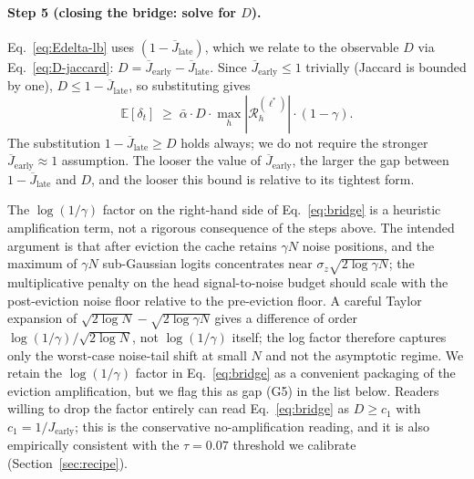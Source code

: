 \documentclass{article} %
\begin{document}
\paragraph{Step 5 (closing the bridge: solve for $D$).}
Eq.~\eqref{eq:Edelta-lb} uses $(1 - \overline{J}_{\text{late}})$, which we
relate to the observable $D$ via Eq.~\eqref{eq:D-jaccard}: $D =
\overline{J}_{\text{early}} - \overline{J}_{\text{late}}$. Since
$\overline{J}_{\text{early}} \leq 1$ trivially (Jaccard is bounded by
one), $D \leq 1 - \overline{J}_{\text{late}}$, so substituting gives
\begin{equation}
\label{eq:final-lb}
\mathbb{E}[\delta_t]
\;\geq\;
\bar\alpha \cdot D \cdot \max_h |\mathcal{R}^{(\ell^*)}_h|
\cdot (1 - \gamma).
\end{equation}
The substitution $1 - \overline{J}_{\text{late}} \geq D$ holds always; we
do not require the stronger $\overline{J}_{\text{early}} \approx 1$
assumption. The looser the value of $\overline{J}_{\text{early}}$, the
larger the gap between $1 - \overline{J}_{\text{late}}$ and $D$, and the
looser this bound is relative to its tightest form.

The $\log(1/\gamma)$ factor on the right-hand side of
Eq.~\eqref{eq:bridge} is a heuristic amplification term, not a rigorous
consequence of the steps above. The intended argument is that after
eviction the cache retains $\gamma N$ noise positions, and the maximum of
$\gamma N$ sub-Gaussian logits concentrates near $\sigma_z \sqrt{2 \log
\gamma N}$; the multiplicative penalty on the head signal-to-noise budget
should scale with the post-eviction noise floor relative to the
pre-eviction floor. A careful Taylor expansion of $\sqrt{2 \log N} -
\sqrt{2 \log \gamma N}$ gives a difference of order $\log(1/\gamma) /
\sqrt{2 \log N}$, not $\log(1/\gamma)$ itself; the log factor therefore
captures only the worst-case noise-tail shift at small $N$ and not the
asymptotic regime. We retain the $\log(1/\gamma)$ factor in
Eq.~\eqref{eq:bridge} as a convenient packaging of the eviction
amplification, but we flag this as gap (G5) in the list below. Readers
willing to drop the factor entirely can read Eq.~\eqref{eq:bridge} as $D
\geq c_1$ with $c_1 = 1/J_{\text{early}}$; this is the conservative
no-amplification reading, and it is also empirically consistent with the
$\tau = 0.07$ threshold we calibrate (Section~\ref{sec:recipe}).
\end{document}
